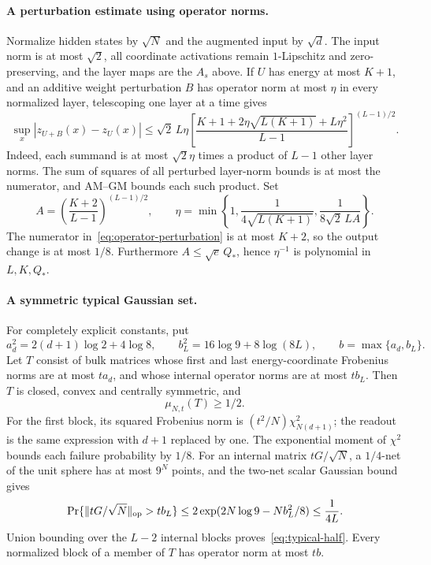 \paragraph{A perturbation estimate using operator norms.}
Normalize hidden states by $\sqrt N$ and the augmented input by $\sqrt d$.
The input norm is at most $\sqrt2$, all coordinate activations remain
$1$-Lipschitz and zero-preserving, and the layer maps are the $A_s$ above.
If $U$ has energy at most $K+1$, and an additive weight perturbation $B$
has operator norm at most $\eta$ in every normalized layer, telescoping
one layer at a time gives
\begin{equation}\label{eq:operator-perturbation}
 \sup_x|z_{U+B}(x)-z_U(x)|
 \le\sqrt2\,L\eta
 \left[\frac{K+1+2\eta\sqrt{L(K+1)}+L\eta^2}{L-1}\right]^{(L-1)/2}.
\end{equation}
Indeed, each summand is at most $\sqrt2\eta$ times a product of $L-1$
other layer norms. The sum of squares of all perturbed layer-norm bounds
is at most the numerator, and AM--GM bounds each such product.
Set
\[
 A=\left(\frac{K+2}{L-1}\right)^{(L-1)/2},\qquad
 \eta=\min\left\{1,\frac1{4\sqrt{L(K+1)}},
                         \frac1{8\sqrt2\,LA}\right\}.
\]
The numerator in~\eqref{eq:operator-perturbation} is at most $K+2$, so the
output change is at most $1/8$. Furthermore
$A\le\sqrt e\,Q_*$, hence $\eta^{-1}$ is polynomial in $L,K,Q_*$.

\paragraph{A symmetric typical Gaussian set.}
For completely explicit constants, put
\[
 a_d^2=2(d+1)\log2+4\log8,\qquad
 b_L^2=16\log9+8\log(8L),\qquad b=\max\{a_d,b_L\}.
\]
Let $T$ consist of bulk matrices whose first and last energy-coordinate
Frobenius norms are at most $ta_d$, and whose internal operator norms are
at most $tb_L$. Then $T$ is closed, convex and centrally symmetric, and
\begin{equation}\label{eq:typical-half}
 \mu_{N,t}(T)\ge1/2.
\end{equation}
For the first block, its squared Frobenius norm is
$(t^2/N)\chi^2_{N(d+1)}$; the readout is the same expression with $d+1$
replaced by one. The exponential moment of $\chi^2$ bounds each failure
probability by $1/8$. For an internal matrix $tG/\sqrt N$, a $1/4$-net of
the unit sphere has at most $9^N$ points, and the two-net scalar Gaussian
bound gives
\[
 \Pr\{\|tG/\sqrt N\|_{\rm op}>tb_L\}
 \le2\exp(2N\log9-Nb_L^2/8)\le\frac1{4L}.
\]
Union bounding over the $L-2$ internal blocks proves~\eqref{eq:typical-half}.
Every normalized block of a member of $T$ has operator norm at most $tb$.


